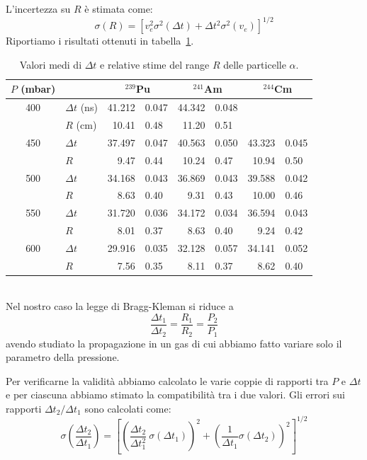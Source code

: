 \documentclass[italian,a4paper]{article}
\renewcommand{\a}{\alpha}
\newcommand{\s}{\sigma}
\newcommand{\D}{\Delta}
\newcommand{\Am}{$^{241}$Am}
\newcommand{\Cm}{$^{244}$Cm}
\newcommand{\Pu}{$^{239}$Pu}
\begin{document}
L'incertezza su $R$ \`e stimata come:
\begin{equation*}
\s(R) = \left[ v_e^2 \s^2(\D t) + \D t^2 \s^2(v_e) \right]^{1/2}
\end{equation*}
Riportiamo i risultati ottenuti in tabella~\ref{range}.
\begin{table}[h!]\centering
\renewcommand{\arraystretch}{1.2}
\begin{tabular}{cl*3{r@{ $\pm$ }l}}
$P$ (mbar)&		&	\multicolumn{2}{c}{\Pu}& \multicolumn{2}{c}{\Am}& \multicolumn{2}{c}{\Cm}\\\midrule[0.15em]
400&	$\D t$ (\unit[100]{ns})&	41.212 & 0.047&    	44.342 & 0.048&		\multicolumn{2}{c}{ } \\
&	$R$ (cm)&			10.41 & 0.48&    	11.20 & 0.51&	 	\multicolumn{2}{c}{ }\\\hline
450&	$\D t$&				37.497 &  0.047&	40.563 &  0.050&	43.323 &  0.045\\
&	$R$&				9.47 &  0.44&	10.24 &  0.47&	10.94 &  0.50\\\hline
500&	$\D t$&				34.168 &  0.043&	36.869 &  0.043&	39.588 &  0.042\\
&	$R$ &				8.63 &  0.40&	9.31 &  0.43&	10.00 &  0.46\\\hline
550&	$\D t$ &			31.720 &  0.036&	34.172 &  0.034&	36.594 &  0.043\\
&	$R$ &				8.01 &  0.37&	8.63 &  0.40&	9.24 &  0.42\\\hline
600&	$\D t$ &			29.916 &  0.035&	32.128 &  0.057&	34.141 &  0.052\\
&	$R$ &				7.56 &  0.35&	8.11 &  0.37&	8.62 &  0.40
\end{tabular}
\caption{Valori medi di $\D t$ e relative stime del range $R$ delle particelle $\a$.}
\label{range}
\end{table}\\
\newpage
Nel nostro caso la legge di Bragg-Kleman si riduce a
\begin{equation*}
\frac{\D t_1}{\D t_2} = \frac{R_1}{R_2} = \frac{P_2}{P_1}
\end{equation*}
avendo studiato la propagazione in un gas di cui abbiamo fatto variare solo il parametro della pressione.

Per verificarne la validit\`a abbiamo calcolato le varie coppie di rapporti tra $P$ e $\D t$ e per ciascuna abbiamo stimato la compatibilit\`a tra i due valori. Gli errori sui rapporti $\D t_2 / \D t_1$ sono calcolati come:
\begin{equation*}
\s\left(\frac{\D t_2}{\D t_1}\right) = \left[ \left(\frac{\D t_2}{\D t_1^2}\: \s(\D t_1)\right)^2
+ \left(\frac{1}{\D t_1} \s(\D t_2)\right)^2\right]^{1/2}
\end{equation*}
\end{document}
